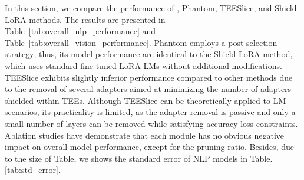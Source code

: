 In this section, we compare the performance of \method, Phantom, TEESlice, and Shield-LoRA methods. The results are presented in Table~\ref{tab:overall_nlp_performance} and Table~\ref{tab:overall_vision_performance}. Phantom employs a post-selection strategy; thus, its model performance are identical to the Shield-LoRA method, which uses standard fine-tuned LoRA-LMs without additional modifications. TEESlice exhibits slightly inferior performance compared to other methods due to the removal of several adapters aimed at minimizing the number of adapters shielded within TEEs. Although TEESlice can be theoretically applied to LM scenarios, its practicality is limited, as the adapter removal is passive and only a small number of layers can be removed while satisfying accuracy loss constraints. 
Ablation studies have demonstrate that each module has no obvious negative impact on overall model performance, except for the pruning ratio. 
Besides, due to the size of Table, we shows the standard error of NLP models in Table.\ref{tab:std_error}.

\begin{table}[htbp]
\centering
\caption{Model Performance Across Tasks (Accuracy \%) with Standard Error of the Mean}
\label{tab:std_error}
\end{table}


